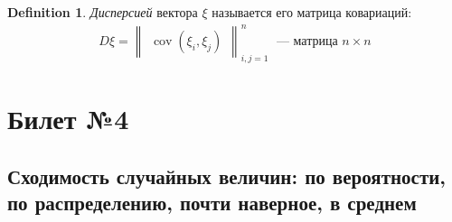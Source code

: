 \documentclass[a4paper]{article}
\theoremstyle{plain}
\theoremstyle{remark}
\theoremstyle{definition}
\newtheorem{definition}{Definition}
\DeclareMathOperator{\cov}{cov}
\begin{document}
\begin{definition}
  \emph{Дисперсией} вектора $\xi$ называется его матрица ковариаций:
  \begin{align*}
    D\xi = \begin{Vmatrix}\cov(\xi_i, \xi_j)\end{Vmatrix}_{i, j = 1}^{n}\; 
    \text{ --- матрица $n \times n$}
  \end{align*}

\end{definition}
\newpage
\section{Билет №4}
\subsection{Сходимость случайных величин: по вероятности, по распределению, почти наверное, в среднем}
\end{document}
